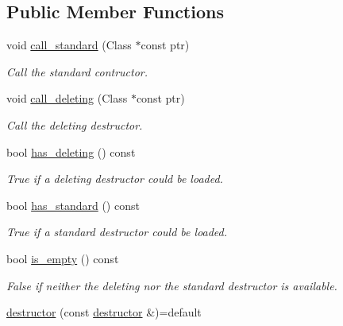 \subsection*{Public Member Functions}
\begin{DoxyCompactItemize}
\item 
void \hyperlink{a00076_a95d55018849080c7d4c771b564e9b04e}{call\+\_\+standard} (Class $\ast$const ptr)\hypertarget{a00076_a95d55018849080c7d4c771b564e9b04e}{}\label{a00076_a95d55018849080c7d4c771b564e9b04e}

\begin{DoxyCompactList}\small\item\em Call the standard contructor. \end{DoxyCompactList}\item 
void \hyperlink{a00076_aabc107ff82b8a6f7e5aed5bd84080b1f}{call\+\_\+deleting} (Class $\ast$const ptr)\hypertarget{a00076_aabc107ff82b8a6f7e5aed5bd84080b1f}{}\label{a00076_aabc107ff82b8a6f7e5aed5bd84080b1f}

\begin{DoxyCompactList}\small\item\em Call the deleting destructor. \end{DoxyCompactList}\item 
bool \hyperlink{a00076_a294eee52606f8fdfbff528adbc50c3ea}{has\+\_\+deleting} () const \hypertarget{a00076_a294eee52606f8fdfbff528adbc50c3ea}{}\label{a00076_a294eee52606f8fdfbff528adbc50c3ea}

\begin{DoxyCompactList}\small\item\em True if a deleting destructor could be loaded. \end{DoxyCompactList}\item 
bool \hyperlink{a00076_a3efe4b3476a9157740a5a8840ae39186}{has\+\_\+standard} () const \hypertarget{a00076_a3efe4b3476a9157740a5a8840ae39186}{}\label{a00076_a3efe4b3476a9157740a5a8840ae39186}

\begin{DoxyCompactList}\small\item\em True if a standard destructor could be loaded. \end{DoxyCompactList}\item 
bool \hyperlink{a00076_adf4ce5f7e9d65a0ec22abf8109f0a5c3}{is\+\_\+empty} () const \hypertarget{a00076_adf4ce5f7e9d65a0ec22abf8109f0a5c3}{}\label{a00076_adf4ce5f7e9d65a0ec22abf8109f0a5c3}

\begin{DoxyCompactList}\small\item\em False if neither the deleting nor the standard destructor is available. \end{DoxyCompactList}\item 
\hyperlink{a00076_a45248a911612597c871150e12ad3208b}{destructor} (const \hyperlink{a00076}{destructor} \&)=default\hypertarget{a00076_a45248a911612597c871150e12ad3208b}{}\label{a00076_a45248a911612597c871150e12ad3208b}


\end{DoxyCompactItemize}
